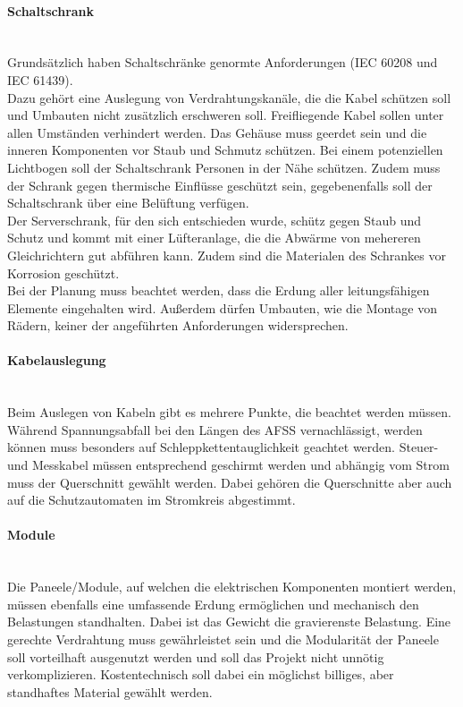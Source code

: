     \paragraph{Schaltschrank}\mbox{}\\
    Grundsätzlich haben Schaltschränke genormte Anforderungen (IEC 60208 und IEC 61439).\\
    Dazu gehört eine Auslegung von Verdrahtungskanäle, die die Kabel schützen soll und Umbauten nicht zusätzlich erschweren soll. Freifliegende Kabel sollen unter allen Umständen verhindert werden. Das Gehäuse muss geerdet sein und die inneren Komponenten vor Staub und Schmutz schützen. Bei einem potenziellen Lichtbogen soll der Schaltschrank Personen in der Nähe schützen. Zudem muss der Schrank gegen thermische Einflüsse geschützt sein, gegebenenfalls soll der Schaltschrank über eine Belüftung verfügen.\\
    Der Serverschrank, für den sich entschieden wurde, schütz gegen Staub und Schutz und kommt mit einer Lüfteranlage, die die Abwärme von mehereren Gleichrichtern gut abführen kann. Zudem sind die Materialen des Schrankes vor Korrosion geschützt. \cite{Schaltschrank-Anforderungen} \\
    Bei der Planung muss beachtet werden, dass die Erdung aller leitungsfähigen Elemente eingehalten wird. Außerdem dürfen Umbauten, wie die Montage von Rädern, keiner der angeführten Anforderungen widersprechen.

    \paragraph{Kabelauslegung}\mbox{}\\
    Beim Auslegen von Kabeln gibt es mehrere Punkte, die beachtet werden müssen. Während Spannungsabfall bei den Längen des AFSS vernachlässigt, werden können muss besonders auf Schleppkettentauglichkeit geachtet werden. Steuer- und Messkabel müssen entsprechend geschirmt werden und abhängig vom Strom muss der Querschnitt gewählt werden. Dabei gehören die Querschnitte aber auch auf die Schutzautomaten im Stromkreis abgestimmt.\\

    \paragraph{Module}\mbox{}\\
    Die Paneele/Module, auf welchen die elektrischen Komponenten montiert werden, müssen ebenfalls eine umfassende Erdung ermöglichen und mechanisch den Belastungen standhalten. Dabei ist das Gewicht die gravierenste Belastung. Eine gerechte Verdrahtung muss gewährleistet sein und die Modularität der Paneele soll vorteilhaft ausgenutzt werden und soll das Projekt nicht unnötig verkomplizieren. Kostentechnisch soll dabei ein möglichst billiges, aber standhaftes Material gewählt werden.

